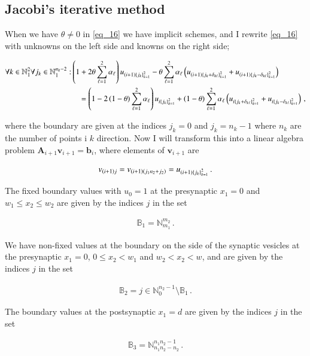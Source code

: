 \documentclass[11pt,english,a4paper]{article}
\begin{document}
\begin{flushleft}
\subsection{Jacobi's iterative method}

When we have $\theta\neq 0$ in \eqref{eq_16} we have implicit schemes, and I rewrite \eqref{eq_16} with unknowns on the left side and knowns on the right side;

\begin{align*}
\forall k\in\mathbb{N}_1^2 \forall j_k \in \mathbb{N}_1^{n_k-2} : &\left({1+2\theta\sum_{\ell=1}^2 \alpha_\ell}\right) u_{(i+1)\left\lbrace{j_k}\right\rbrace_{k=1}^2} - \theta\sum_{\ell = 1}^2\alpha_\ell \left({u_{(i+1)\left\lbrace{j_k+\delta_{k\ell}}\right\rbrace_{k=1}^2} + u_{(i+1)\left\lbrace{j_k-\delta_{k\ell}}\right\rbrace_{k=1}^2}}\right) 
\\
&\quad = \left({1-2\left({1-\theta}\right)\sum_{\ell = 1}^2 \alpha_\ell}\right) u_{i\left\lbrace{j_k}\right\rbrace_{k=1}^2} + \left({1-\theta}\right)\sum_{\ell=1}^2\alpha_\ell\left({u_{i\left\lbrace{j_k+\delta_{k\ell}}\right\rbrace_{k=1}^2} + u_{i\left\lbrace{j_k-\delta_{k\ell}}\right\rbrace_{k=1}^2}}\right) \,,
\end{align*}

where the boundary are given at the indices $j_k=0$ and $j_k= n_k-1$ where $n_k$ are the number of points i $k$ direction. Now I will transform this into a linear algebra problem $\textbf{A}_{i+1}\textbf{v}_{i+1} = \textbf{b}_i$, where elements of $\textbf{v}_{i+1}$ are

\begin{align}
v_{(i+1)j} = v_{(i+1)(j_1 n_2 + j_2)} = u_{(i+1)\left\lbrace{j_k}\right\rbrace_{k=1}^2} \,.
\label{eq_22}
\end{align}

The fixed boundary values with $u_0=1$ at the presynaptic $x_1=0$ and $w_1 \leq x_2 \leq w_2$ are given by the indices $j$ in the set

\begin{align*}
\mathbb{B}_1 = \mathbb{N}_{m_1}^{m_2}\,.
\end{align*}

We have non-fixed values at the boundary on the side of the synaptic vesicles at the presynaptic $x_1=0$, $0 \leq x_2 < w_1$ and $w_2 < x_2 < w$, and are given by the indices $j$ in the set

\begin{align*}
\mathbb{B}_2 = j\in\mathbb{N}_0^{n_2-1} \setminus \mathbb{B}_1 \,.
\end{align*}

The boundary values at the postsynaptic $x_1=d$ are given by the indices $j$ in the set

\begin{align*}
\mathbb{B}_3 = \mathbb{N}_{n_1 n_2 - n_2}^{n_1 n_2 - 1} \,.
\end{align*}


\end{flushleft}
\end{document}
